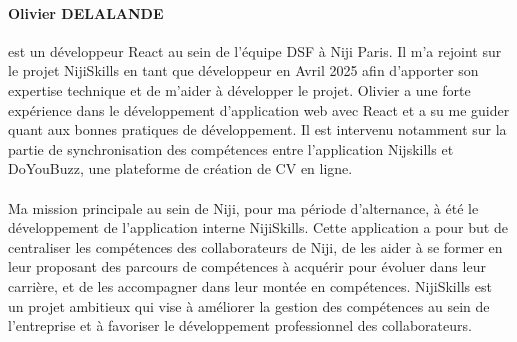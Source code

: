 \documentclass[12pt]{article}
\begin{document}
\paragraph{Olivier DELALANDE} est un développeur React au sein de l'équipe DSF à Niji Paris. Il m'a rejoint sur le projet NijiSkills en tant que développeur en Avril 2025 afin d'apporter son expertise technique et de m'aider à développer le projet. Olivier a une forte expérience dans le développement d'application web avec React et a su me guider quant aux bonnes pratiques de développement. Il est intervenu notamment sur la partie de synchronisation des compétences entre l'application Nijskills et DoYouBuzz, une plateforme de création de CV en ligne.
\\\\
Ma mission principale au sein de Niji, pour ma période d'alternance, à été le développement de l'application interne NijiSkills. Cette application a pour but de centraliser les compétences des collaborateurs de Niji, de les aider à se former en leur proposant des parcours de compétences à acquérir pour évoluer dans leur carrière, et de les accompagner dans leur montée en compétences. NijiSkills est un projet ambitieux qui vise à améliorer la gestion des compétences au sein de l'entreprise et à favoriser le développement professionnel des collaborateurs.
\end{document}

